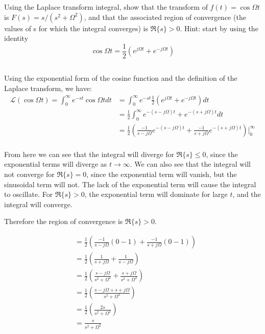 \section{}

Using the Laplace transform integral, show that the transform of $f(t) = \cos \Omega t$ is
$F(s) = s/(s^2 + \Omega^2)$, and that the associated region of convergence 
(the values of s for which the integral converges) is $\Re\{s\} > 0$. 
Hint: start by using the identity
\[
    \cos \Omega t = \frac{1}{2} \left( e^{j\Omega t} + e^{-j\Omega t} \right)
\]

\subsection{}
Using the exponential form of the cosine function and the definition of the Laplace transform, we have:
\[
\begin{aligned}
    \mathcal{L}(\cos \Omega t) = \int_{0}^{\infty} e^{-st} \cos \Omega t dt &=
    \int_{0}^{\infty} e^{-st} \frac{1}{2} \left( e^{j\Omega t} + e^{-j\Omega t} \right) dt \\
    &= \frac{1}{2} \int_{0}^{\infty} e^{-(s-j\Omega)t} + e^{-(s+j\Omega)t} dt \\
    &= \frac{1}{2} \left( \frac{-1}{s-j\Omega} e^{-(s-j\Omega)t} + \frac{-1}{s+j\Omega} e^{-(s+j\Omega)t} \right) \bigg|_{0}^{\infty} \\
\end{aligned}
\]

From here we can see that the integral will diverge for $\Re\{s\} \leq 0$, since the exponential terms will diverge as $t \rightarrow \infty$.
We can also see that the integral will not converge for $\Re\{s\} = 0$, since the exponential term will vanish, but the sinusoidal term will not.
The lack of the exponential term will cause the integral to oscillate. For $\Re\{s\} > 0$, the exponential term will dominate for large $t$, and the integral will converge.

Therefore the region of convergence is $\Re\{s\} > 0$.

\[
\begin{aligned}
    &= \frac{1}{2} \left( \frac{-1}{s-j\Omega} \left( 0 - 1 \right) + \frac{-1}{s+j\Omega} \left( 0 - 1 \right) \right) \\
    &= \frac{1}{2} \left( \frac{1}{s+j\Omega} + \frac{1}{s-j\Omega} \right) \\
    &= \frac{1}{2} \left( \frac{s-j\Omega}{s^2 + \Omega^2} + \frac{s+j\Omega}{s^2 + \Omega^2} \right) \\
    &= \frac{1}{2} \left( \frac{s-j\Omega + s+j\Omega}{s^2 + \Omega^2} \right) \\
    &= \frac{1}{2} \left( \frac{2s}{s^2 + \Omega^2} \right) \\
    &= \boxed{\frac{s}{s^2 + \Omega^2}}
\end{aligned}
\]
